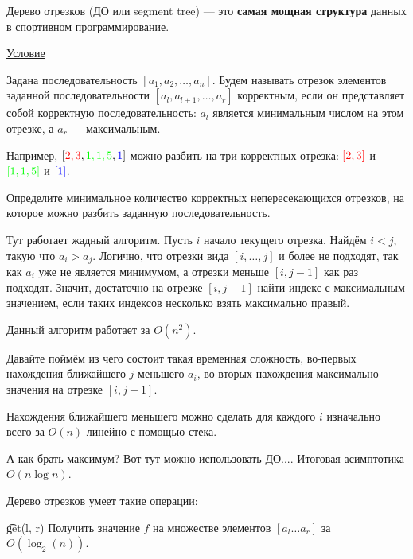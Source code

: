 
Дерево отрезков (ДО или segment tree) --- это {\bf самая мощная структура} данных в спортивном программирование.


\down

\href{https://codeforces.com/gym/102154/problem/B}{Условие}


\down

Задана последовательность $[a_1, a_2, \dots, a_n]$. Будем называть отрезок элементов заданной последовательности $[a_l, a_{l + 1}, \dots, a_r]$ корректным, если он представляет собой корректную последовательность: $a_l$ является минимальным числом на этом отрезке, а $a_r$ — максимальным.

Например, $[{\color{red}{2,3}}, {\color{green}{1,1,5}}, {\color{blue}{1}}]$ можно разбить на три корректных отрезка: ${\color{red}{[2,3]}}$ и ${\color{green}{[1,1,5]}}$ и ${\color{blue}{[1]}}$.

\down

Определите минимальное количество корректных непересекающихся отрезков, на которое можно разбить заданную последовательность. 

\down

Тут работает жадный алгоритм. Пусть $i$ начало текущего отрезка. Найдём $i < j$, такую что $a_i > a_j$. Логично, что отрезки вида $[i, \dots, j]$ и более не подходят, так как $a_i$ уже не является минимумом, а отрезки меньше $[i, j - 1]$ как раз подходят. Значит, достаточно на отрезке $[i, j - 1]$ найти индекс с максимальным значением, если таких индексов несколько взять максимально правый.

Данный алгоритм работает за $O(n^2)$.

\down

Давайте поймём из чего состоит такая временная сложность, во-первых нахождения ближайшего $j$ меньшего $a_i$, во-вторых нахождения максимально значения на отрезке $[i, j - 1]$.

Нахождения ближайшего меньшего можно сделать для каждого $i$ изначально всего за $O(n)$ линейно с помощью стека.

А как брать максимум? Вот тут можно использовать ДО.... Итоговая асимптотика $O(n \log n)$.

\pagebreak	

Дерево отрезков умеет такие операции:

\t{get(l, r)} Получить значение $f$ на множестве элементов $[a_l \ldots a_r]$ за $O(\log_2(n))$.

